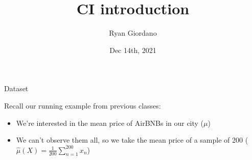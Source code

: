 \documentclass[8pt]{beamer}\usepackage[]{graphicx}\usepackage[]{color}
\title{CI introduction}
\author{Ryan Giordano}
\date{Dec 14th, 2021}
\institute{Massachusetts Institute of Technology}
\begin{document}

\begin{frame}[fragile]{Dataset}

Recall our running example from previous classes:\footnotemark[1]

\begin{itemize}
    \item We're interested in the mean price of AirBNBs in our city ($\mu$)
    \item We can't observe them all, so we take the mean
          price of a sample of 200 ($\hat\mu(X) = \frac{1}{200} \sum_{n=1}^{200} x_n$)
\end{itemize}


\begin{center}
\begin{minipage}{0.9\textwidth}
\end{minipage}
\end{center}

\vfill
{}

\end{frame}




\end{document}
